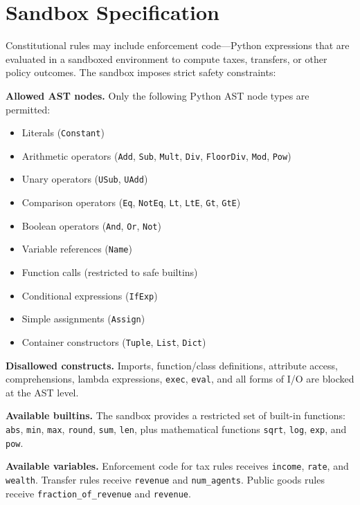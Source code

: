 \documentclass[12pt]{article}
\begin{document}
\section{Sandbox Specification}\label{app:sandbox}

Constitutional rules may include enforcement code---Python expressions that are evaluated in a sandboxed environment to compute taxes, transfers, or other policy outcomes. The sandbox imposes strict safety constraints:

\textbf{Allowed AST nodes.} Only the following Python AST node types are permitted:
\begin{itemize}
  \item Literals (\texttt{Constant})
  \item Arithmetic operators (\texttt{Add}, \texttt{Sub}, \texttt{Mult}, \texttt{Div}, \texttt{FloorDiv}, \texttt{Mod}, \texttt{Pow})
  \item Unary operators (\texttt{USub}, \texttt{UAdd})
  \item Comparison operators (\texttt{Eq}, \texttt{NotEq}, \texttt{Lt}, \texttt{LtE}, \texttt{Gt}, \texttt{GtE})
  \item Boolean operators (\texttt{And}, \texttt{Or}, \texttt{Not})
  \item Variable references (\texttt{Name})
  \item Function calls (restricted to safe builtins)
  \item Conditional expressions (\texttt{IfExp})
  \item Simple assignments (\texttt{Assign})
  \item Container constructors (\texttt{Tuple}, \texttt{List}, \texttt{Dict})
\end{itemize}

\textbf{Disallowed constructs.} Imports, function/class definitions, attribute access, comprehensions, lambda expressions, \texttt{exec}, \texttt{eval}, and all forms of I/O are blocked at the AST level.

\textbf{Available builtins.} The sandbox provides a restricted set of built-in functions: \texttt{abs}, \texttt{min}, \texttt{max}, \texttt{round}, \texttt{sum}, \texttt{len}, plus mathematical functions \texttt{sqrt}, \texttt{log}, \texttt{exp}, and \texttt{pow}.

\textbf{Available variables.} Enforcement code for tax rules receives \texttt{income}, \texttt{rate}, and \texttt{wealth}. Transfer rules receive \texttt{revenue} and \texttt{num\_agents}. Public goods rules receive \texttt{fraction\_of\_revenue} and \texttt{revenue}.
\end{document}
